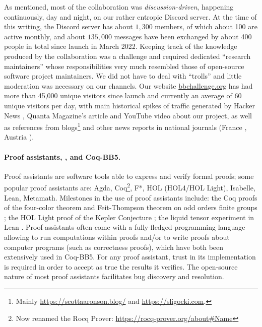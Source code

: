 \documentclass[a4paper,british]{article}
\theoremstyle{definition} %
\numberwithin{equation}{section}
\theoremstyle{definition} %
\newcommand{\CoqBB}{Coq-BB5\xspace}
\begin{document}
As mentioned, most of the collaboration was \textit{discussion-driven}, happening continuously, day and night, on our rather entropic Discord server. At the time of this writing, the Discord server has about $1{,}300$ members, of which about 100 are active monthly, and about $135{,}000$ messages have been exchanged by about 400 people in total since launch in March 2022. Keeping track of the knowledge produced by the collaboration was a challenge and required dedicated ``research maintainers'' whose responsibilities very much resembled those of open-source software project maintainers. We did not have to deal with ``trolls'' and little moderation was necessary on our channels. Our website \href{https://bbchallenge.or}{bbchallenge.org} has had more than 45,000 unique visitors since launch and currently an average of 60 unique visitors per day, with main historical spikes of traffic generated by Hacker News \cite{bmc7505_2023_busybeaver}, Quanta Magazine's article \cite{brubaker2024_bb5_quanta} and YouTube video \cite{quanta2025_busybeaver_video} about our project, as well as references from blogs\footnote{Mainly \url{https://scottaaronson.blog/} and \url{https://sligocki.com}.} and other news reports in national journals (France \cite{larousserie2024_castor}, Austria \cite{derstandard2025_fleissiger_biber}).















\paragraph{Proof assistants, \Coq, and \CoqBB.} Proof assistants are software tools able to express and verify formal proofs; some popular proof assistants are: Agda, Coq\footnote{Now renamed the Rocq Prover: \url{https://rocq-prover.org/about\#Name}}, F*, HOL (HOL4/HOL Light), Isabelle, Lean, Metamath. Milestones in the use of proof assistants include: the Coq proofs of the four-color theorem \cite{gonthier2008formal, gonthier2023computer} and Feit-Thompson theorem on odd orders finite groups \cite{gonthier2013machine}; the HOL Light proof of the Kepler Conjecture \cite{3fdf2c9143a54629bba02e34f24c7698}; the liquid tensor experiment in Lean \cite{2309.14870,LeanCommunityLTE2022}. Proof assistants often come with a fully-fledged programming language allowing to run computations within proofs and/or to write proofs about computer programs (such as correctness proofs), which have both been extensively used in \CoqBB. For any proof assistant, trust in its implementation is required in order to accept as true the results it verifies. The open-source nature of most proof assistants facilitates bug discovery and resolution.
\end{document}
